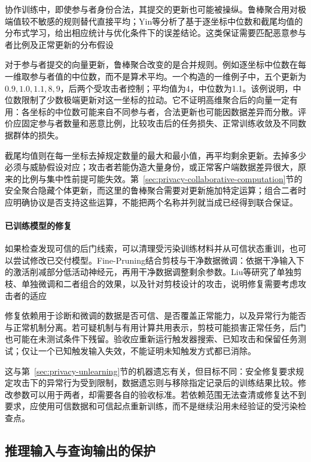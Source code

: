 协作训练中，即使参与者身份合法，其提交的更新也可能被操纵。鲁棒聚合用对极端值较不敏感的规则替代直接平均；Yin等分析了基于逐坐标中位数和截尾均值的分布式学习，给出相应统计与优化条件下的误差结论。这类保证需要匹配恶意参与者比例及正常更新的分布假设

对于参与者提交的向量更新，鲁棒聚合改变的是合并规则。例如逐坐标中位数在每一维取参与者值的中位数，而不是算术平均。一个构造的一维例子中，五个更新为$0.9,1.0,1.1,8,9$，后两个受攻击者控制；平均值为4，中位数为1.1。该例说明，中位数限制了少数极端更新对这一坐标的拉动。它不证明高维聚合后的向量一定有用：各坐标的中位数可能来自不同参与者，合法更新也可能因数据差异而分散。评价应固定参与者数量和恶意比例，比较攻击后的任务损失、正常训练收敛及不同数据群体的损失。

截尾均值则在每一坐标去掉规定数量的最大和最小值，再平均剩余更新。去掉多少必须与威胁假设对应；攻击者若能伪造大量身份，或正常客户端数据差异很大，原来的比例与集中性前提可能失效。第~\ref{sec:privacy-collaborative-computation}节的安全聚合隐藏个体更新，而这里的鲁棒聚合需要对更新施加特定运算；组合二者时应明确协议是否支持这些运算，不能把两个名称并列就当成已经得到联合保证。

\paragraph{已训练模型的修复}

如果检查发现可信的后门线索，可以清理受污染训练材料并从可信状态重训，也可以尝试修改已交付模型。Fine-Pruning结合剪枝与干净数据微调：依据干净输入下的激活削减部分低活动神经元，再用干净数据调整剩余参数。Liu等研究了单独剪枝、单独微调和二者组合的效果，以及针对剪枝设计的攻击，说明修复需要考虑攻击者的适应

修复依赖用于诊断和微调的数据是否可信、是否覆盖正常能力，以及异常行为能否与正常机制分离。若可疑机制与有用计算共用表示，剪枝可能损害正常任务，后门也可能在未测试条件下残留。验收应重新运行触发器搜索、已知攻击和保留任务测试；仅让一个已知触发输入失效，不能证明未知触发方式都已消除。

这与第~\ref{sec:privacy-unlearning}节的机器遗忘有关，但目标不同：安全修复要求规定攻击下的异常行为受到限制，数据遗忘则与移除指定记录后的训练结果比较。修改参数可以用于两者，却需要各自的验收标准。若依赖范围无法查清或修复达不到要求，应使用可信数据和可信起点重新训练，而不是继续沿用未经验证的受污染检查点。

\subsection{推理输入与查询输出的保护}
\label{sec:security-information-defense}
\label{sec:security-input-defense}

